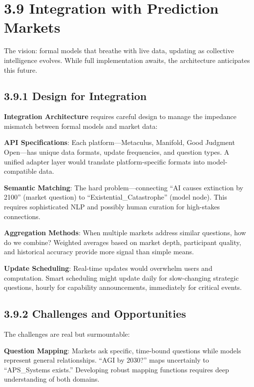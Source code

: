 \documentclass[
  11pt,
  letterpaper,
  openany]{book}
\begin{document}
\section{3.9 Integration with Prediction
Markets}\label{sec-market-integration}

The vision: formal models that breathe with live data, updating as
collective intelligence evolves. While full implementation awaits, the
architecture anticipates this future.

\subsection{3.9.1 Design for Integration}\label{sec-integration-design}

\textbf{Integration Architecture} requires careful design to manage the
impedance mismatch between formal models and market data:

\textbf{API Specifications}: Each platform---Metaculus, Manifold, Good
Judgment Open---has unique data formats, update frequencies, and
question types. A unified adapter layer would translate
platform-specific formats into model-compatible data.

\textbf{Semantic Matching}: The hard problem---connecting ``AI causes
extinction by 2100'' (market question) to ``Existential\_Catastrophe''
(model node). This requires sophisticated NLP and possibly human
curation for high-stakes connections.

\textbf{Aggregation Methods}: When multiple markets address similar
questions, how do we combine? Weighted averages based on market depth,
participant quality, and historical accuracy provide more signal than
simple means.

\textbf{Update Scheduling}: Real-time updates would overwhelm users and
computation. Smart scheduling might update daily for slow-changing
strategic questions, hourly for capability announcements, immediately
for critical events.

\subsection{3.9.2 Challenges and
Opportunities}\label{sec-market-challenges}

The challenges are real but surmountable:

\textbf{Question Mapping}: Markets ask specific, time-bound questions
while models represent general relationships. ``AGI by 2030?'' maps
uncertainly to ``APS\_Systems exists.'' Developing robust mapping
functions requires deep understanding of both domains.
\end{document}
